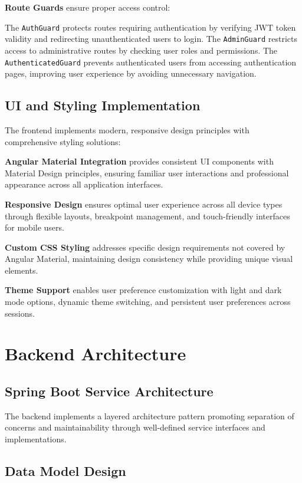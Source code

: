 \documentclass[12pt,a4paper]{article}
\begin{document}
\textbf{Route Guards} ensure proper access control:

The \texttt{AuthGuard} protects routes requiring authentication by verifying JWT token validity and redirecting unauthenticated users to login. The \texttt{AdminGuard} restricts access to administrative routes by checking user roles and permissions. The \texttt{AuthenticatedGuard} prevents authenticated users from accessing authentication pages, improving user experience by avoiding unnecessary navigation.

\subsection{UI and Styling Implementation}

The frontend implements modern, responsive design principles with comprehensive styling solutions:

\textbf{Angular Material Integration} provides consistent UI components with Material Design principles, ensuring familiar user interactions and professional appearance across all application interfaces.

\textbf{Responsive Design} ensures optimal user experience across all device types through flexible layouts, breakpoint management, and touch-friendly interfaces for mobile users.

\textbf{Custom CSS Styling} addresses specific design requirements not covered by Angular Material, maintaining design consistency while providing unique visual elements.

\textbf{Theme Support} enables user preference customization with light and dark mode options, dynamic theme switching, and persistent user preferences across sessions.

\section{Backend Architecture}

\subsection{Spring Boot Service Architecture}

The backend implements a layered architecture pattern promoting separation of concerns and maintainability through well-defined service interfaces and implementations.

\subsection{Data Model Design}
\end{document}
